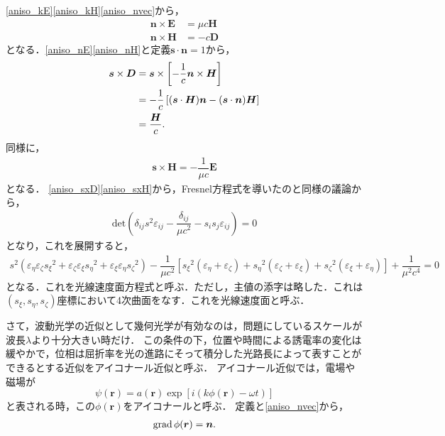\eqref{aniso_kE}\eqref{aniso_kH}\eqref{aniso_nvec}から，
\begin{align}
  \boldsymbol{n}\times\boldsymbol{E} &= \mu{c}\boldsymbol{H}\label{aniso_nE}\\
  \boldsymbol{n}\times\boldsymbol{H} &= -c\boldsymbol{D}\label{aniso_nH}
\end{align}
となる．\eqref{aniso_nE}\eqref{aniso_nH}と定義$\boldsymbol{s}\cdot\boldsymbol{n}=1$から，
\begin{align}
  \boldsymbol{s}\times\boldsymbol{D} &= \boldsymbol{s}\times\left[-\dfrac{1}{c}\boldsymbol{n}\times\boldsymbol{H}\right]\notag\\
  &= -\dfrac{1}{c}\left[(\boldsymbol{s}\cdot\boldsymbol{H})\boldsymbol{n}-(\boldsymbol{s}\cdot\boldsymbol{n})\boldsymbol{H}\right]\notag\\
  &= \dfrac{\boldsymbol{H}}{c} . \label{aniso_sxD}
\end{align}
同様に，
\begin{align}
  \boldsymbol{s}\times\boldsymbol{H}=-\dfrac{1}{\mu{}c}\boldsymbol{E}\label{aniso_sxH}
\end{align}
となる．
\eqref{aniso_sxD}\eqref{aniso_sxH}から，Fresnel方程式を導いたのと同様の議論から，
\begin{align*}
  \text{det}\left(\delta_{ij}s^2\varepsilon_{ij}-\dfrac{\delta_{ij}}{\mu{}c^2}-s_is_j\varepsilon_{ij}\right)=0
\end{align*}
となり，これを展開すると，
\begin{align}
  s^2(\varepsilon_\eta\varepsilon_\zeta{s_\xi}^2+\varepsilon_\zeta\varepsilon_\xi{s_\eta}^2+\varepsilon_\xi\varepsilon_\eta{s_\zeta}^2)
  -\dfrac{1}{\mu{}c^2}\left[{s_\xi}^2(\varepsilon_\eta+\varepsilon_\zeta)+{s_\eta}^2(\varepsilon_\zeta+\varepsilon_\xi)+{s_\zeta}^2(\varepsilon_\xi+\varepsilon_\eta)\right]
  +\dfrac{1}{\mu^2c^4}=0
\end{align}
となる．これを光線速度面方程式と呼ぶ．ただし，主値の添字は略した．これは$(s_\xi,s_\eta,s_\zeta)$座標において4次曲面をなす．これを光線速度面と呼ぶ．

さて，波動光学の近似として幾何光学が有効なのは，問題にしているスケールが波長$\lambda$より十分大きい時だけ．
この条件の下，位置や時間による誘電率の変化は緩やかで，位相は屈折率を光の進路にそって積分した光路長によって表すことができるとする近似をアイコナール近似と呼ぶ．
アイコナール近似では，電場や磁場が
\[\psi(\boldsymbol{r})=a(\boldsymbol{r})\exp[i(k\phi(\boldsymbol{r})-\omega{}t)]\]
と表される時，この$\phi(\boldsymbol{r})$をアイコナールと呼ぶ．
定義と\eqref{aniso_nvec}から，
\begin{align}
  \operatorname{grad}\phi(\boldsymbol{r}) = \boldsymbol{n}.\label{aniso_gradphi}
\end{align}

